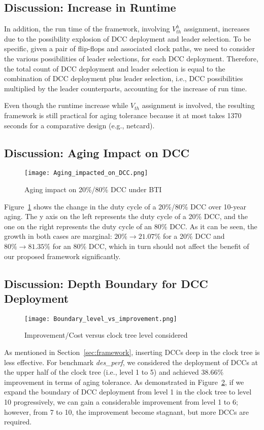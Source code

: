 \subsection{Discussion: Increase in Runtime}
In addition, the run time of the framework, involving $V_{th}^h$ assignment, increases due to the possibility explosion of DCC deployment and leader selection. To be specific, given a pair of flip-flops and associated clock paths, we need to consider the various possibilities of leader selections, for each DCC deployment. Therefore, the total  count of DCC deployment and leader selection is equal to the combination of DCC deployment plus leader selection, i.e., DCC possibilities multiplied by the leader counterparts, accounting for the increase of run time. 

Even though the runtime increase while $V_{th}$ assignment is involved, the resulting framework is still practical for aging tolerance because it at most takes 1370 seconds for a comparative design (e.g., netcard).
\subsection{Discussion: Aging Impact on DCC}
\begin{figure}
    \centering
     \texttt{[image: Aging\_impacted\_on\_DCC.png]} %
    \caption{Aging impact on 20\%/80\% DCC under BTI}
    \label{fig:exp4}
\end{figure}

Figure~\ref{fig:exp4} shows the change in the duty cycle of a 20\%/80\% DCC over 10-year aging. The y axis on the left represents the duty cycle of a 20\% DCC, and the one on the right represents the duty cycle of an 80\% DCC. As it can be seen, the growth in both cases are marginal: $20\% \to 21.07\%$ for a 20\% DCC and $80\% \to 81.35\%$ for an 80\% DCC, which in turn should not affect the benefit of our proposed framework significantly.


\subsection{Discussion: Depth Boundary for DCC Deployment}
\begin{figure}
    \centering
    \texttt{[image: Boundary\_level\_vs\_improvement.png]} %
    \caption{Improvement/Cost versus clock tree level considered}
    \label{fig:boundary}
\end{figure}

As mentioned in Section~\ref{sec:framework}, inserting DCCs deep in the clock tree is less effective. For benchmark \textit{des\_perf}, we considered the deployment of DCCs at the upper half of the clock tree (i.e., level 1 to 5) and achieved 38.66\% improvement in terms of aging tolerance. As demonstrated in Figure~\ref{fig:boundary}, if we expand the boundary of DCC deployment from level 1 in the clock tree to level 10 progressively, we can gain a considerable improvement from level 1 to 6; however, from 7 to 10, the improvement become stagnant, but more DCCs are required.